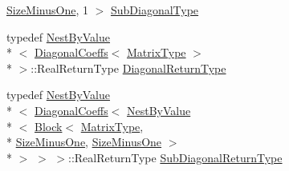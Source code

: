 \begin{DoxyCompactItemize}
\hyperlink{class_tridiagonalization_a3689c5ded00bea1abc23f299a3a2190aa73700bfd4b6c78591ad89b0ccbad3ea3}{Size\-Minus\-One}, 1 $>$ \hyperlink{class_tridiagonalization_aa2c70f74fdd0ebda80b4dec2248f3732}{Sub\-Diagonal\-Type}
\item 
typedef \hyperlink{class_nest_by_value}{Nest\-By\-Value}\\*
$<$ \hyperlink{class_diagonal_coeffs}{Diagonal\-Coeffs}$<$ \hyperlink{class_tridiagonalization_a527ab9a2b51075a625d5a7f1ef44b3c6}{Matrix\-Type} $>$\\*
 $>$\-::Real\-Return\-Type \hyperlink{class_tridiagonalization_a4641fd1d32be493cb55fe788e331c9c6}{Diagonal\-Return\-Type}
\item 
typedef \hyperlink{class_nest_by_value}{Nest\-By\-Value}\\*
$<$ \hyperlink{class_diagonal_coeffs}{Diagonal\-Coeffs}$<$ \hyperlink{class_nest_by_value}{Nest\-By\-Value}\\*
$<$ \hyperlink{class_block}{Block}$<$ \hyperlink{class_tridiagonalization_a527ab9a2b51075a625d5a7f1ef44b3c6}{Matrix\-Type}, \\*
\hyperlink{class_tridiagonalization_a3689c5ded00bea1abc23f299a3a2190aa73700bfd4b6c78591ad89b0ccbad3ea3}{Size\-Minus\-One}, \hyperlink{class_tridiagonalization_a3689c5ded00bea1abc23f299a3a2190aa73700bfd4b6c78591ad89b0ccbad3ea3}{Size\-Minus\-One} $>$\\*
 $>$ $>$ $>$\-::Real\-Return\-Type \hyperlink{class_tridiagonalization_a33e6be2d3c2de1a7cebc05f5b90dc50a}{Sub\-Diagonal\-Return\-Type}
\end{DoxyCompactItemize}
